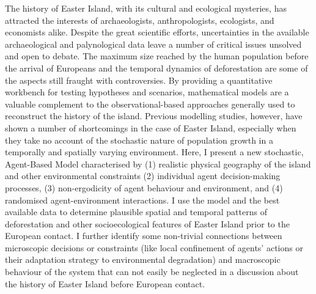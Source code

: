 
The history of Easter Island, with its cultural and ecological mysteries, has attracted the interests of archaeologists, anthropologists, ecologists, and econo\-mists alike. Despite the great scientific efforts, uncertainties in the available archaeological and palynological data leave a number of critical issues unsolved and open to debate. The maximum size reached by the human population before the arrival of Europeans and the temporal dynamics of deforestation are some of the aspects still fraught with controversies. By providing a quantitative workbench for testing hypotheses and scenarios, mathematical models are a valuable complement to the observational-based approaches generally used to reconstruct the history of the island. Previous modelling studies, however, have shown a number of shortcomings in the case of Easter Island, especially when they take no account of the stochastic nature of population growth in a temporally and spatially varying environment. Here, I present a new stochastic, Agent-Based Model characterised by (1) realistic physical geography of the island and other environmental constraints (2) individual agent decision-making processes, (3) non-ergodicity of agent behaviour and environment, and (4) randomised agent-environment interactions. I use the model and the best available data to determine plausible spatial and temporal patterns of deforestation and other socioecological features of Easter Island prior to the European contact. 
I further identify some non-trivial connections between microscopic decisions or constraints (like local confinement of agents' actions or their adaptation strategy to environmental degradation) and macroscopic behaviour of the system that can not easily be neglected in a discussion about the history of Easter Island before European contact.



